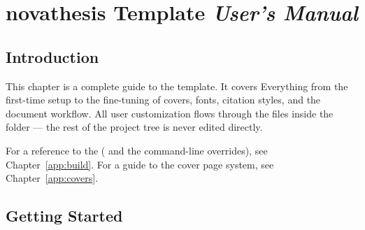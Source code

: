 

%

\chapter{\texorpdfstring{\textbf{nova}thesis}{novathesis} Template \emph{User's Manual}}
\label{cha:users_manual}

\glsresetall


\section{Introduction}
\label{sec:intro_manual}

This chapter is a complete guide to the \novathesis{} template.  It covers
Everything from the first-time setup to the fine-tuning of covers, fonts,
citation styles, and the document workflow.  All user customization flows
through the files inside the  folder — the rest of the
project tree is never edited directly.

For a reference to the  (
and the command-line overrides), see Chapter~\ref{app:build}.  For a guide to
the cover page system, see Chapter~\ref{app:covers}.


\section{Getting Started}
\label{sec:getting_started_manual}

